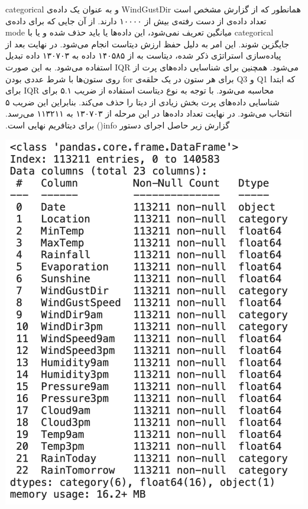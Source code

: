 ‫همانطور که از گزارش مشخص است WindGustDir و  به عنوان یک داده‌ی categorical تعداد داده‌ی از دست رفته‌ی بیش از ۱۰۰۰۰ دارند. از آن جایی که برای داده‌ی categorical میانگین تعریف نمی‌شود، این داده‌ها یا باید حذف شده و یا با mode جایگزین شوند. این امر به دلیل حفظ ارزش دیتاست انجام می‌شود. \newline
‫در نهایت بعد از پیاده‌سازی استراتژی ذکر شده، دیتاست به از ۱۴۰۵۸۵ داده به ۱۳۰۷۰۳ داده تبدیل می‌شود. \newline
‫همچنین برای شناسایی داده‌های پرت از IQR استفاده می‌شود. به این صورت که ابتدا Q1 و Q3 برای هر ستون در یک حلقه‌ی for روی ستون‌ها با شرط عددی بودن محاسبه می‌شود. با توجه به نوع دیتاست استفاده از ضریب ۵.۱ برای IQR برای شناسایی داده‌های پرت بخش زیادی از دیتا را حذف می‌کند. بنابراین این ضریب ۵ انتخاب می‌شود. در نهایت تعداد داده‌ها در این مرحله از ۱۳۰۷۰۳ به ۱۱۳۲۱۱ می‌رسد. گزارش زیر حاصل اجرای دستور info() برای دیتافریم نهایی است.
‫
‫\begin{center}
‫\includegraphics[scale=0.35]{figs/info3.png}
‫\end{center}
‫
‫‫‫\vspace{1cm}
